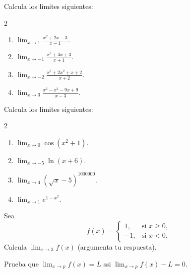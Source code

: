 \documentclass[12pt,a4paper]{book}
\begin{document}
    \begin{ejercicio}\label{ej:142}
        Calcula los límites siguientes:
        \begin{multicols}{2}
        \begin{enumerate}[nosep]
            \item $\lim_{x\to 1}\frac{x^{2}+2x-3}{x-1}$.
            \item $\lim_{x\to -1}\frac{x^{2}+4x+3}{x+1}$.
            \item $\lim_{x\to -2}\frac{x^{3}+2x^{2}+x+2}{x+2}$.
            \item $\lim_{x\to 3}\frac{x^{3}-x^{2}-9x+9}{x-3}$.
        \end{enumerate}
        \end{multicols}
    \end{ejercicio}

    \begin{ejercicio}\label{ej:143}
        Calcula los límites siguientes:
        \begin{multicols}{2}
        \begin{enumerate}[nosep]
            \item $\lim_{x\to 0}\cos\left(x^{2}+1\right)$.
            \item $\lim_{x\to -5}\ln(x+6)$.
            \item $\lim_{x\to 4}\left(\sqrt{x}-5\right)^{1000000}$.
            \item $\lim_{x\to 1}e^{1-x^{2}}$.
        \end{enumerate}
        \end{multicols}
    \end{ejercicio}

    \begin{ejercicio}\label{ej:144}
        Sea
        \begin{equation*}
            f(x)=\begin{cases}
                1, & \text{si }x\geq 0,\\
                -1, & \text{si }x<0.
            \end{cases}
        \end{equation*}
        Calcula $\lim_{x\to 3}f(x)$ (argumenta tu respuesta).
    \end{ejercicio}

    \begin{ejercicio}\label{ej:145}
        Prueba que $\lim_{x\to p}f(x)=L$ ssi $\lim_{x\to p}f(x)-L=0$.
    \end{ejercicio}
\end{document}
